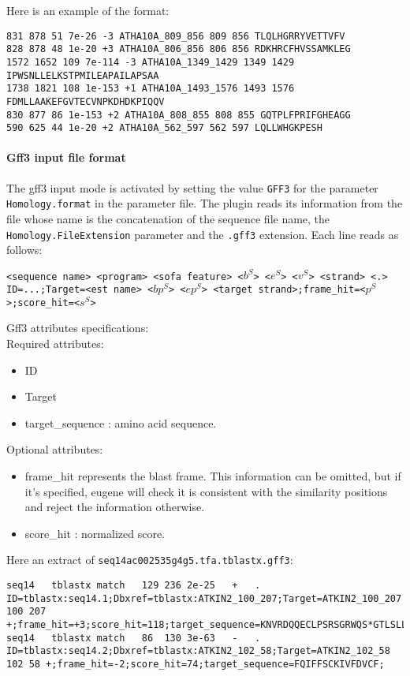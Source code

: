 Here is an example of the format:
\begin{Verbatim}[fontsize=\small]
831 878 51 7e-26 -3 ATHA10A_809_856 809 856 TLQLHGRRYVETTVFV
828 878 48 1e-20 +3 ATHA10A_806_856 806 856 RDKHRCFHVSSAMKLEG
1572 1652 109 7e-114 -3 ATHA10A_1349_1429 1349 1429 IPWSNLLELKSTPMILEAPAILAPSAA
1738 1821 108 1e-153 +1 ATHA10A_1493_1576 1493 1576 FDMLLAAKEFGVTECVNPKDHDKPIQQV
830 877 86 1e-153 +2 ATHA10A_808_855 808 855 GQTPLFPRIFGHEAGG
590 625 44 1e-20 +2 ATHA10A_562_597 562 597 LQLLWHGKPESH
\end{Verbatim}

\paragraph{Gff3 input file format}

The gff3 input mode is activated by setting the value \texttt{GFF3}
for the parameter \texttt{Homology.format} in the parameter file. The
plugin reads its information from the file whose name is the concatenation
of the sequence file name, the \texttt{Homology.FileExtension} parameter 
and the \texttt{.gff3} extension. Each line reads as follows:

\texttt{<sequence name> <program> <sofa feature> <$b^S$> <$e^S$> <$v^S$> <strand> <.> 
ID=...;Target=<est name> <$bp^S$> <$ep^S$> <target strand>;frame\_hit=<$p^S$>;score\_hit=<$s^S$>}

Gff3 attributes specifications:\\
Required attributes:
	\begin{itemize}
	\item ID
	\item Target
	\item target\_sequence : amino acid sequence.
	\end{itemize}

Optional attributes:
	\begin{itemize}
	\item frame\_hit represents the blast frame. This information
          can be omitted, but if it's specified, eugene will check it
          is consistent with the similarity positions and reject the
          information otherwise.
	\item score\_hit : normalized score.
	\end{itemize}


Here an extract of \texttt{seq14ac002535g4g5.tfa.tblastx.gff3}:
\begin{Verbatim}[fontsize=\tiny]
seq14	tblastx	match	129	236	2e-25	+	.	ID=tblastx:seq14.1;Dbxref=tblastx:ATKIN2_100_207;Target=ATKIN2_100_207 100 207 +;frame_hit=+3;score_hit=118;target_sequence=KNVRDQQECLPSRSGRWQS*GTLSLLEQSTDRLFKL;
seq14	tblastx	match	86	130	3e-63	-	.	ID=tblastx:seq14.2;Dbxref=tblastx:ATKIN2_102_58;Target=ATKIN2_102_58 102 58 +;frame_hit=-2;score_hit=74;target_sequence=FQIFFSCKIVFDVCF;
\end{Verbatim}


